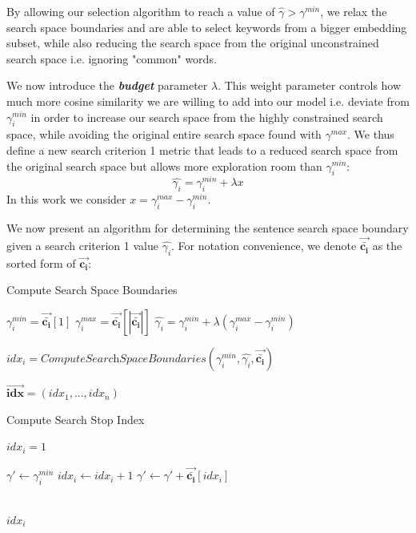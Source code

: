 \documentclass[12pt]{article}
\begin{document}
By allowing our selection algorithm to reach a value of $\hat{\gamma} > \gamma^{min}$, we relax the search space boundaries and are able to select keywords from a bigger embedding subset, while also reducing the search space from the original unconstrained search space i.e. ignoring "common" words.

We now introduce the \textit{\textbf{budget}} parameter $\lambda$. This weight parameter controls how much more cosine similarity we are willing to add into our model i.e. deviate from $\gamma_{i}^{min}$ in order to increase our search space from the highly constrained search space, while avoiding the original entire search space found with $\gamma^{max}$. We thus define a new search criterion 1 metric that leads to a reduced search space from the original search space but allows more exploration room than $\gamma_{i}^{min}$: \[\hat{\gamma_{i}} = \gamma_{i}^{min} + \lambda x\]
In this work we consider $x = \gamma_{i}^{max}-\gamma_{i}^{min}$.

We now present an algorithm for determining the sentence search space boundary given a search criterion 1 value $\hat{\gamma_{i}}$. For notation convenience, we denote $\bm{\vec{\bar{c_i}}}$ as the sorted form of $\bm{\vec{c_i}}$:

\begin{algorithm}[H]
\caption{Compute Search Space Boundaries}
\begin{algorithmic}[1]
\State$ \gamma_{i}^{min} = \bm{\vec{\bar{c_i}}}[1]$
\State$ \gamma_{i}^{max} = \bm{\vec{\bar{c_i}}}[| \bm{\vec{\bar{c_i}}}|]$
\State$ \hat{\gamma_{i}} = \gamma_{i}^{min} + \lambda(\gamma_{i}^{max} - \gamma_{i}^{min})$

\State $idx_i = \textit{ComputeSearchSpaceBoundaries}(\gamma_{i}^{min}, \hat{\gamma_{i}}, \bm{\vec{\bar{c_i}}})$
 \EndFor




\Return $\bm{\vec{idx}} = (idx_1, ..., idx_n)$
\EndProcedure
\end{algorithmic}
\end{algorithm}

\begin{algorithm}[H]
\caption{Compute Search Stop Index}\label{euclid}
\begin{algorithmic}[1]

\State $idx_i = 1$

\State $\gamma\prime \gets \gamma_{i}^{min}$
\State $idx_i \gets idx_i + 1$
\State $\gamma\prime \gets \gamma\prime + \bm{\vec{\bar{c_i}}}[idx_i]$


\EndWhile
\\
\Return $idx_i$
\EndProcedure
\end{algorithmic}
\end{algorithm}
\end{document}
